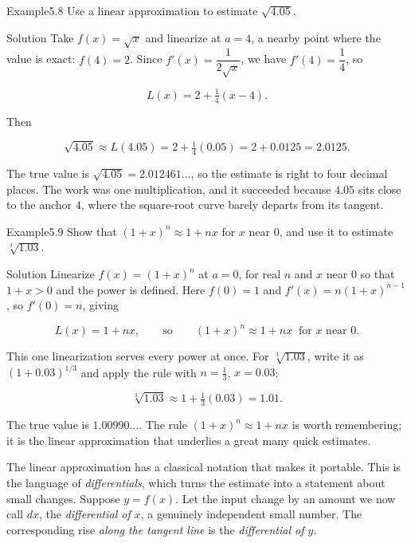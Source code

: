 \documentclass[a4paper,12pt,oneside]{memoir}
\begin{document}
\begin{workedexample}
\begin{envexample}{Example}{5.8}{}
Use a linear approximation to estimate \(\sqrt{4.05}\).
\end{envexample}
\begin{envsolution}{Solution}{}{}
Take \(f(x) = \sqrt{x}\) and linearize at \(a = 4\), a nearby point where the value is exact: \(f(4) = 2\). Since \(f'(x) = \dfrac{1}{2\sqrt{x}}\), we have \(f'(4) = \dfrac{1}{4}\), so

\[ L(x) = 2 + \tfrac{1}{4}(x - 4). \]

Then

\[ \sqrt{4.05} \approx L(4.05) = 2 + \tfrac{1}{4}(0.05) = 2 + 0.0125 = 2.0125. \]

The true value is \(\sqrt{4.05} = 2.012461\ldots\), so the estimate is right to four decimal places. The work was one multiplication, and it succeeded because \(4.05\) sits close to the anchor \(4\), where the square-root curve barely departs from its tangent. \qedmark
\end{envsolution}
\end{workedexample}
\begin{workedexample}
\begin{envexample}{Example}{5.9}{}
Show that \((1 + x)^{n} \approx 1 + nx\) for \(x\) near \(0\), and use it to estimate \(\sqrt[3]{1.03}\).
\end{envexample}
\begin{envsolution}{Solution}{}{}
Linearize \(f(x) = (1 + x)^{n}\) at \(a = 0\), for real \(n\) and \(x\) near \(0\) so that \(1 + x > 0\) and the power is defined. Here \(f(0) = 1\) and \(f'(x) = n(1 + x)^{n-1}\), so \(f'(0) = n\), giving

\[ L(x) = 1 + nx, \qquad \text{so} \qquad (1 + x)^{n} \approx 1 + nx \ \text{ for } x \text{ near } 0. \]

This one linearization serves every power at once. For \(\sqrt[3]{1.03}\), write it as \((1 + 0.03)^{1/3}\) and apply the rule with \(n = \tfrac{1}{3}\), \(x = 0.03\):

\[ \sqrt[3]{1.03} \approx 1 + \tfrac{1}{3}(0.03) = 1.01. \]

The true value is \(1.00990\ldots\). The rule \((1 + x)^{n} \approx 1 + nx\) is worth remembering; it is the linear approximation that underlies a great many quick estimates. \qedmark
\end{envsolution}
\end{workedexample}
The linear approximation has a classical notation that makes it portable. This is the language of \emph{differentials}, which turns the estimate into a statement about small changes. Suppose \(y = f(x)\). Let the input change by an amount we now call \(dx\), the \emph{differential of \(x\)}, a genuinely independent small number. The corresponding rise \emph{along the tangent line} is the \emph{differential of \(y\)}.
\end{document}
